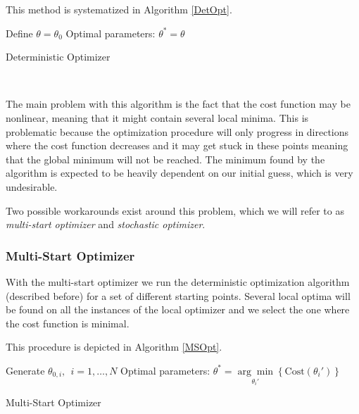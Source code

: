 This method is systematized in Algorithm \ref{DetOpt}.

\begin{algorithm}[H]\label{DetOpt}
\DontPrintSemicolon
 Define $\theta=\theta_0$
 Optimal parameters: $\theta^{*}=\theta$\;
 \caption{Deterministic Optimizer}
\end{algorithm}
\ 

The main problem with this algorithm is the fact that the cost function may be nonlinear, meaning that it might contain several local minima. This is problematic because the optimization procedure will only progress in directions where the cost function decreases and it may get stuck in these points meaning that the global minimum will not be reached.
The minimum found by the algorithm is expected to be heavily dependent on our initial guess, which is very undesirable.


Two possible workarounds exist around this problem, which we will refer to as \emph{multi-start optimizer} and \emph{stochastic optimizer}.

\subsubsection{Multi-Start Optimizer}
With the multi-start optimizer we run the deterministic optimization algorithm (described before) for a set of different starting points. Several local optima will be found on all the instances of the local optimizer and we select the one where the cost function is minimal.

This procedure is depicted in Algorithm \ref{MSOpt}.

\begin{algorithm}[H]\label{MSOpt}
\DontPrintSemicolon
Generate $\theta_{0,i},\ \ i=1,\ldots,N$
 Optimal parameters: $\theta^{*}=\underset{\theta_i'}{\arg\min}\left\{\mathrm{Cost}(\theta_i')\right\}$\;
 \caption{Multi-Start Optimizer}
\end{algorithm}
\ 


